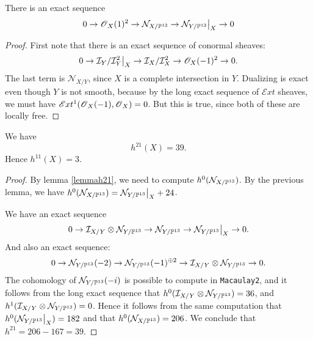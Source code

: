 \documentclass[11pt, english]{article}
\begin{document}
\begin{lemma}
There is an exact sequence
\[
0 \to \OO_X(1)^2 \to \mathcal N_{X/\PP^{13}} \to \restr{\mathcal N_{Y/\PP^{13}} }{X} \to 0
\]
\end{lemma}
\begin{proof}
First note that there is an exact sequence of conormal sheaves:
\[
0 \to \restr{ \mathcal I_Y /\mathcal I_Y^2 }{X} \to \mathcal I_X/\mathcal I_X^2 \to \mathscr O_X(-1)^2 \to 0.
\]
The last term is $\mathcal N_{X/Y}$, since $X$ is a complete intersection in $Y$. Dualizing is exact even though $Y$ is not smooth, because by the long exact sequence of $\mathscr {E}xt$ sheaves, we must have $\mathscr{E}xt^1(\operatorname{\mathscr{O}}_X(-1),\operatorname{\mathscr{O}}_X)=0$. But this is true, since both of these are locally free.
\end{proof}

\begin{prop}
 We have 
\[
h^{21}(X) = 39.
\]
Hence $h^{11}(X)=3$.
\end{prop}
\begin{proof}
By lemma \ref{lemmah21}, we need to compute $h^0(\mathcal N_{X/\mathbb{P}^{13}})$. By the previous lemma, we have $h^0(\mathcal N_{X/\PP^{13}})=\restr{\mathcal N_{Y/\PP^{13}}}{X}+24$. 

We have an exact sequence
\[
0 \to \mathcal I_{X/Y} \otimes \mathcal N_{Y/\PP^{13}} \to  \mathcal N_{Y/\PP^{13}} \to \restr{\mathcal N_{Y/\PP^{13}}}{X} \to 0.
\]
And also an exact sequence:
\[
0 \to \mathcal N_{Y/\mathbb{P}^{13}}(-2) \to \mathcal N_{Y/\mathbb{P}^{13}}(-1)^{\oplus 2} \to \mathcal I_{X/Y} \otimes \mathcal N_{Y/\mathbb{P}^{13}} \to 0.
\]
The cohomology of $\mathcal N_{Y/\mathbb{P}^{13}}(-i)$ is possible to compute in \verb|Macaulay2|, and it follows from the long exact sequence that $h^0(\mathcal I_{X/Y} \otimes \mathcal N_{Y/\mathbb{P}^{13}})=36$, and $h^1(\mathcal I_{X/Y} \otimes \mathcal N_{Y/\mathbb{P}^{13}})=0$. Hence it follows from the same computation that $h^0(\restr{\mathcal N_{Y/\PP^{13}}}{X})=182$ and that $h^0(\mathcal N_{X/\mathbb{P}^{13}})=206$. We conclude that $h^{21}=206-167=39$.
\end{proof}

 

\end{document}
